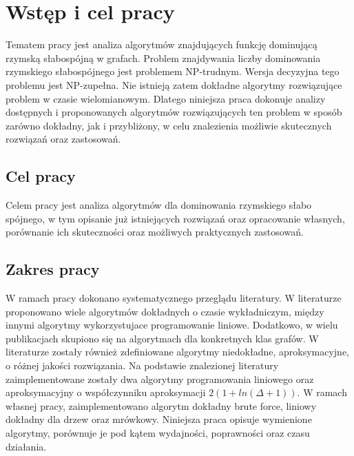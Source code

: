 \chapter{Wstęp i cel pracy}
Tematem pracy jest analiza algorytmów znajdujących funkcję dominującą rzymską słabospójną w grafach.
Problem znajdywania liczby dominowania rzymskiego słabospójnego jest problemem NP-trudnym. Wersja decyzyjna tego problemu jest NP-zupełna. Nie istnieją zatem dokładne algorytmy rozwiązujące problem w czasie wielomianowym. Dlatego niniejsza praca dokonuje analizy dostępnych i proponowanych algorytmów rozwiązujących ten problem w sposób zarówno dokładny, jak i przybliżony, w celu znalezienia możliwie skutecznych rozwiązań oraz zastosowań.

\section{Cel pracy}
Celem pracy jest analiza algorytmów dla dominowania rzymskiego słabo spójnego, w tym opisanie już istniejących rozwiązań oraz opracowanie własnych, porównanie ich skuteczności oraz możliwych praktycznych zastosowań.

\section{Zakres pracy}
W ramach pracy dokonano systematycznego przeglądu literatury. W literaturze proponowano wiele algorytmów dokładnych o czasie wykładniczym, między innymi algorytmy wykorzystujace programowanie liniowe. Dodatkowo, w wielu publikacjach skupiono się na algorytmach dla konkretnych klas grafów. W literaturze zostały również zdefiniowane algorytmy niedokładne, aproksymacyjne, o różnej jakości rozwiązania.
Na podstawie znalezionej literatury zaimplementowane zostały dwa algorytmy programowania liniowego oraz aproksymacyjny o współczynniku aproksymacji $2(1 + ln(\Delta + 1))$. W ramach własnej pracy, zaimplementowano algorytm dokładny brute force, liniowy dokładny dla drzew oraz mrówkowy.
Niniejsza praca opisuje wymienione algorytmy, porównuje je pod kątem wydajności, poprawności oraz czasu działania.

